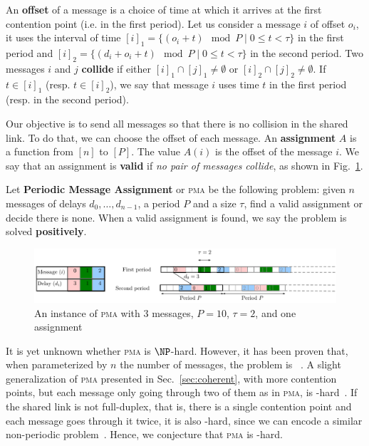 \documentclass[a4paper,UKenglish,cleveref, autoref, thm-restate]{lipics-v2019}
\newcommand\pma{\textsc{pma}\xspace}
\begin{document}
An \textbf{offset} of a message is a choice of time at which it arrives at the first contention point (i.e. in the first period). Let us consider a message $i$ of offset $o_i$, it uses the interval of time $[i]_1 = \{ (o_i + t) \mod P \mid 0 \leq t < \tau \}$ in the first period and $[i]_2 = \{ (d_i + o_i + t) \mod P \mid 0 \leq t < \tau \}$ in the second period. Two messages $i$ and $j$ \textbf{collide} if either $[i]_1 \cap [j]_1 \neq \emptyset $ or $[i]_2 \cap [j]_2 \neq \emptyset $. If $t \in [i]_1$ (resp. $t \in [i]_2$), we say that message $i$ uses time $t$ in the first period (resp. in the second period).
 
Our objective is to send all messages so that there is no collision in the shared link.
To do that, we can choose the offset of each message. An \textbf{assignment} $A$ is a function from $[n]$ to $[P]$. The value $A(i)$ is the offset of the message $i$. We say that an assignment is \textbf{valid} if \emph{no pair of messages collide}, as shown in Fig.~\ref{fig:assignment}.

Let \textbf{Periodic Message Assignment} or \pma be the following problem: given $n$ messages of delays $d_0,\dots,d_{n-1}$, a period $P$ and a size $\tau$, find a valid assignment or decide there is none. When a valid assignment is found, we say the problem is solved \textbf{positively}.

\begin{figure}
\begin{center}
\includegraphics[scale=0.7]{instance}
\end{center}
\caption{An instance of \pma with $3$ messages, $P= 10$, $\tau = 2$, and one assignment}
\label{fig:assignment}
\end{figure}

It is yet unknown whether \pma is $\NP$-hard. However, it has been proven that, when parameterized by $n$ the number of messages, the problem is \FPT~\cite{barth2018deterministic}. A slight generalization of \pma presented in Sec.~\ref{sec:coherent}, with more contention points, but each message only going through two of them as in \pma, is \NP-hard~\cite{barth2018deterministic}. If the shared link is not full-duplex, that is, there is a single contention point and each message goes through it twice, it is also \NP-hard, since we can encode a similar non-periodic problem~\cite{orman1997complexity}. 
Hence, we conjecture that \pma is \NP-hard.
	
\end{document}
